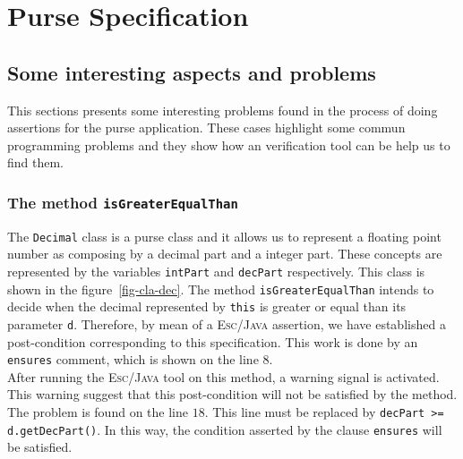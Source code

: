 \section{Purse Specification}
\label{sec-pur-spe}

\subsection{Some interesting aspects and problems}
This sections presents some interesting problems found in the process
of doing assertions for the purse application. These cases highlight
some commun programming problems and they show how an verification
tool can be help us to find them. 

\subsubsection{The method {\tt \bf isGreaterEqualThan}}

The \texttt{Decimal} class is a purse class and it allows us to
represent a floating point number as
composing by a decimal part and a integer part. These concepts are
represented by the variables \texttt{intPart} and \texttt{decPart}
respectively. This class is shown in the figure~\ref{fig-cla-dec}. The
method \texttt{isGreaterEqualThan} intends to decide when the decimal
represented by \texttt{this} is greater or equal than its parameter
\texttt{d}. Therefore, by mean of a \textsc{Esc/Java} assertion, we
have established a post-condition corresponding to this
specification. This work is done by an \texttt{ensures} comment, which
is shown on the line $8$. \\

After running the \textsc{Esc/Java} tool on this method, a warning
signal is activated. This warning suggest that this post-condition
will not be satisfied by the method. The problem is found on the line
$18$. This line must be replaced by \texttt{decPart >=
d.getDecPart()}. In this way, the condition asserted by the clause
\texttt{ensures} will be satisfied.


